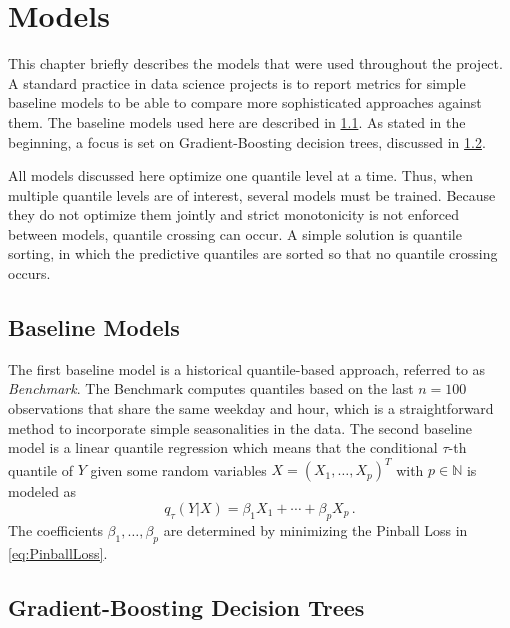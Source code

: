 
\section{Models}
\label{ch:Models}

This chapter briefly describes the models that were used throughout the project. A standard practice in data science projects is to report metrics for simple baseline models to be able to compare more sophisticated approaches against them. The baseline models used here are described in \cref{sec:Models:Baselines}. As stated in the beginning, a focus is set on Gradient-Boosting decision trees, discussed in \cref{sec:Models:GBDT}.

All models discussed here optimize one quantile level at a time. Thus, when multiple quantile levels are of interest, several models must be trained. Because they do not optimize them jointly and strict monotonicity is not enforced between models, quantile crossing can occur. A simple solution is quantile sorting, in which the predictive quantiles are sorted so that no quantile crossing occurs.

\subsection{Baseline Models}
\label{sec:Models:Baselines}

The first baseline model is a historical quantile-based approach, referred to as \textit{Benchmark}. The Benchmark computes quantiles based on the last $n = 100$ observations that share the same weekday and hour, which is a straightforward method to incorporate simple seasonalities in the data. The second baseline model is a linear quantile regression \parencite{koenker_regression_1978} which means that the conditional $\tau$-th quantile of $Y$ given some random variables $X = (X_1, \ldots, X_p)^T$ with $p \in \mathbb{N}$ is modeled as
\begin{equation}
    q_\tau(Y | X) = \beta_1 X_1 + \cdots + \beta_p X_p \, .
\end{equation}
The coefficients $\beta_1, \ldots, \beta_p$ are determined by minimizing the Pinball Loss in \cref{eq:PinballLoss}.

\subsection{Gradient-Boosting Decision Trees}
\label{sec:Models:GBDT}

